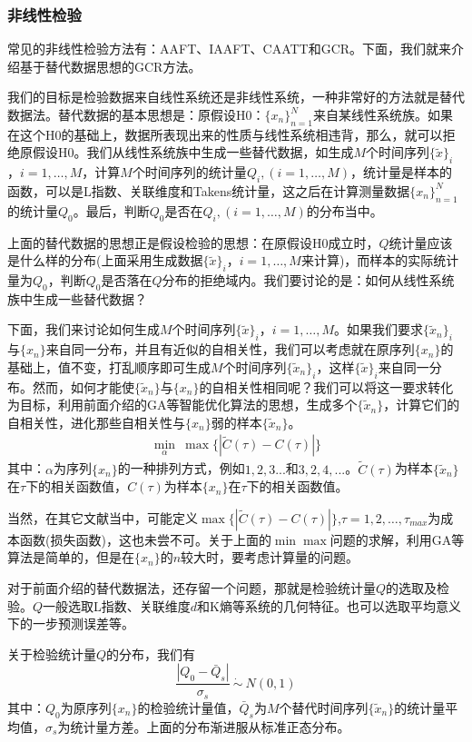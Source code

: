         \subsubsection{非线性检验}
            \par
            常见的非线性检验方法有：AAFT、IAAFT、CAATT和GCR。下面，我们就来介绍基于替代数据思想的GCR方法。
            \par
            我们的目标是检验数据来自线性系统还是非线性系统，一种非常好的方法就是替代数据法。替代数据的基本思想是：原假设H0：$\{x_n\}_{n = 1}^N$来自某线性系统族。如果在这个H0的基础上，数据所表现出来的性质与线性系统相违背，那么，就可以拒绝原假设H0。我们从线性系统族中生成一些替代数据，如生成$M$个时间序列$\{\tilde{x}\}_i$，$i = 1,\dots ,M$，计算$M$个时间序列的统计量$Q_i,(i= 1,\dots ,M)$，统计量是样本的函数，可以是L指数、关联维度和Takens统计量，这之后在计算测量数据$\{x_n\}_{n = 1}^N$的统计量$Q_0$。最后，判断$Q_0$是否在$Q_i,(i= 1,\dots ,M)$的分布当中。
            \par
            上面的替代数据的思想正是假设检验的思想：在原假设H0成立时，$Q$统计量应该是什么样的分布(上面采用生成数据$\{\tilde{x}\}_i$，$i = 1,\dots ,M$来计算)，而样本的实际统计量为$Q_0$，判断$Q_0$是否落在$Q$分布的拒绝域内。我们要讨论的是：如何从线性系统族中生成一些替代数据？
            \par
            下面，我们来讨论如何生成$M$个时间序列$\{\tilde{x}\}_i$，$i = 1,\dots ,M$。如果我们要求$\{\tilde{x}_n\}_i$与$\{x_n\}$来自同一分布，并且有近似的自相关性，我们可以考虑就在原序列$\{x_n\}$的基础上，值不变，打乱顺序即可生成$M$个时间序列$\{\tilde{x}_n\}_i$，这样$\{\tilde{x}\}_i$来自同一分布。然而，如何才能使$\{\tilde{x}_n\}$与$\{x_n\}$的自相关性相同呢？我们可以将这一要求转化为目标，利用前面介绍的GA等智能优化算法的思想，生成多个$\{\tilde{x}_n\}$，计算它们的自相关性，进化那些自相关性与$\{x_n\}$弱的样本$\{\tilde{x}_n\}$。
            \begin{align*}
                \min_\alpha \  \max\{|\tilde{C}(\tau) - C(\tau)|\}
            \end{align*}
            其中：$\alpha$为序列$\{x_n\}$的一种排列方式，例如$1,2,3...$和$3,2,4,...$。$\tilde{C}(\tau)$为样本$\{\tilde{x}_n\}$在$\tau$下的相关函数值，$C(\tau)$为样本$\{x_n\}$在$\tau$下的相关函数值。
            \par
            当然，在其它文献当中，可能定义$\max\{|\tilde{C}(\tau) - C(\tau)|\}$,$\tau = 1,2,\dots, \tau_{max}$为成本函数(损失函数)，这也未尝不可。关于上面的$\min\max$问题的求解，利用GA等算法是简单的，但是在$\{x_n\}$的$n$较大时，要考虑计算量的问题。
            \par
            对于前面介绍的替代数据法，还存留一个问题，那就是检验统计量$Q$的选取及检验。$Q$一般选取L指数、关联维度$d$和K熵等系统的几何特征。也可以选取平均意义下的一步预测误差等。
            \par
            关于检验统计量$Q$的分布，我们有
            \[
                \frac{|Q_0 - \bar{Q}_s|}{\sigma_s} \ \dot{\sim}\  N(0,1)
            \]
            其中：$Q_0$为原序列$\{x_n\}$的检验统计量值，$\bar{Q}_s$为$M$个替代时间序列$\{\tilde{x}_n\}$的统计量平均值，$\sigma_s$为统计量方差。上面的分布渐进服从标准正态分布。

